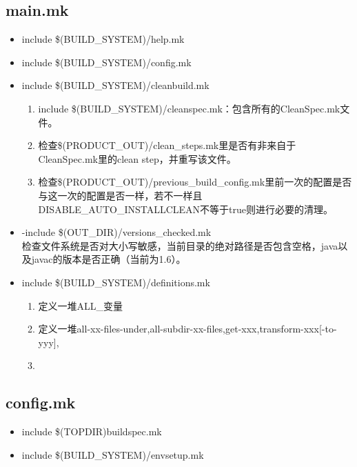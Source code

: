 \documentclass[a4paper,11pt]{article}
\begin{document}
\begin{CJK*}{UTF8}{gbsn}
    \subsection{main.mk}
    \begin{itemize}
        \item include \$(BUILD\_SYSTEM)/help.mk \\
        \item include \$(BUILD\_SYSTEM)/config.mk \\
        \item include \$(BUILD\_SYSTEM)/cleanbuild.mk \\
        \begin{enumerate}
            \item include \$(BUILD\_SYSTEM)/cleanspec.mk：包含所有的CleanSpec.mk文件。
            \item 检查\$(PRODUCT\_OUT)/clean\_steps.mk里是否有非来自于CleanSpec.mk里的clean step，并重写该文件。
            \item 检查\$(PRODUCT\_OUT)/previous\_build\_config.mk里前一次的配置是否与这一次的配置是否一样，若不一样且DISABLE\_AUTO\_INSTALLCLEAN不等于true则进行必要的清理。
        \end{enumerate} 
        \item -include \$(OUT\_DIR)/versions\_checked.mk \\
            检查文件系统是否对大小写敏感，当前目录的绝对路径是否包含空格，java以及javac的版本是否正确（当前为1.6）。
        \item include \$(BUILD\_SYSTEM)/definitions.mk \\
        \begin{enumerate}
            \item 定义一堆ALL\_变量
            \item 定义一堆all-xx-files-under,all-subdir-xx-files,get-xxx,transform-xxx[-to-yyy],
            \item 
        \end{enumerate} 
    \end{itemize} 


    \subsection{config.mk}
    \begin{itemize}
        \item \-include \$(TOPDIR)buildspec.mk \\
        \item include \$(BUILD\_SYSTEM)/envsetup.mk
    \end{itemize} 


\end{CJK*}
\end{document}
